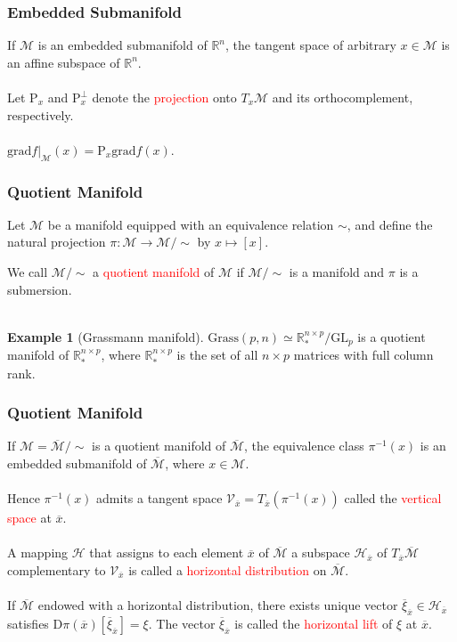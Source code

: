 \documentclass[notheorems,envcountsect,pdfpagemode=FullScreen,12pt]{beamer}
\theoremstyle{plain}
\theoremstyle{definition}
\theoremstyle{example}
\newtheorem{example}{Example}
\begin{document}
\begin{frame}
\frametitle{Embedded Submanifold}
\quad If $\mathcal{M}$ is an embedded submanifold of $\mathbb{R}^n$, the tangent space of arbitrary $x\in\mathcal{M}$ is an affine subspace of $\mathbb{R}^n$.
\\~\\
\quad Let $\mathrm{P}_x$ and $\mathrm{P}^\perp_x$ denote the \textcolor{red}{projection} onto $T_x\mathcal{M}$ and its orthocomplement, respectively.
\\~\\
\quad $\mathrm{grad}f|_{\mathcal{M}}(x)=\mathrm{P}_x\mathrm{grad}f(x)$.
\end{frame}

\begin{frame}
\frametitle{Quotient Manifold}
\quad Let $\mathcal{M}$ be a manifold equipped with an equivalence relation $\sim$, and define the natural projection $\pi:\mathcal{M}\to\mathcal{M}/\sim$ by $x\mapsto[x]$.\par
\quad We call $\mathcal{M}/\sim$ a \textcolor{red}{quotient manifold} of $\mathcal{M}$ if $\mathcal{M}/\sim$ is a manifold and $\pi$ is a submersion.
\\~\\
\begin{example}[Grassmann manifold]
$\mathrm{Grass}(p,n)\simeq\mathbb{R}^{n\times p}_*/\mathrm{GL}_p$ is a quotient manifold of $\mathbb{R}^{n\times p}_*$, where $\mathbb{R}^{n\times p}_*$ is the set of all $n\times p$ matrices with full column rank.
\end{example}
\end{frame}

\begin{frame}
\frametitle{Quotient Manifold}
\quad If $\mathcal{M}=\overline{\mathcal{M}}/\sim$ is a quotient manifold of $\overline{\mathcal{M}}$, the equivalence class $\pi^{-1}(x)$ is an embedded submanifold of $\overline{\mathcal{M}}$, where $x\in\mathcal{M}$.
\\~\\
\quad Hence $\pi^{-1}(x)$ admits a tangent space $\mathcal{V}_{\overline{x}}=T_{\overline{x}}(\pi^{-1}(x))$ called the \textcolor{red}{vertical space} at $\overline{x}$.
\\~\\
\quad A mapping $\mathcal{H}$ that assigns to each element $\overline{x}$ of $\overline{\mathcal{M}}$ a subspace $\mathcal{H}_{\overline{x}}$ of $T_{\overline{x}}\overline{\mathcal{M}}$ complementary to $\mathcal{V}_{\overline{x}}$ is called a \textcolor{red}{horizontal distribution} on $\overline{\mathcal{M}}$.
\\~\\
\quad If $\overline{\mathcal{M}}$ endowed with a horizontal distribution, there exists unique vector $\overline{\xi}_{\overline{x}}\in\mathcal{H}_{\overline{x}}$ satisfies $\mathrm{D}\pi(\overline{x})[\overline{\xi}_{\overline{x}}]=\xi$. The vector $\overline{\xi}_{\overline{x}}$ is called the \textcolor{red}{horizontal lift} of $\xi$ at $\overline{x}$.
\end{frame}
\end{document}
